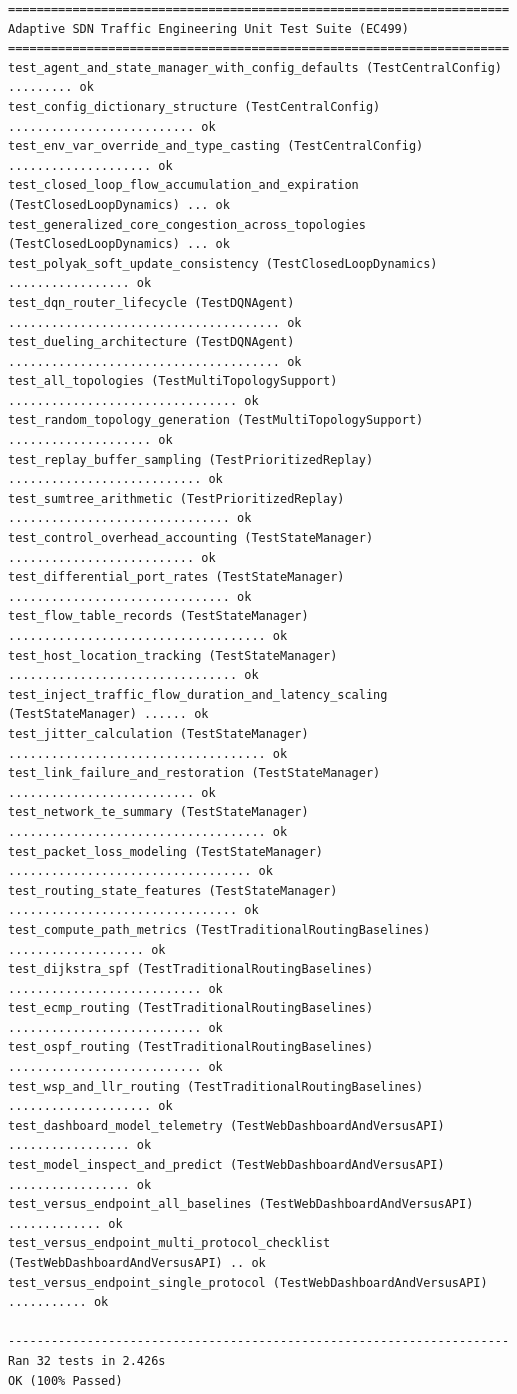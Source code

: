 \begin{lstlisting}[basicstyle=\ttfamily\scriptsize, caption={Full Execution Log of the Automated Test Suite (test\_suite.py)}]
======================================================================
Adaptive SDN Traffic Engineering Unit Test Suite (EC499)
======================================================================
test_agent_and_state_manager_with_config_defaults (TestCentralConfig) ......... ok
test_config_dictionary_structure (TestCentralConfig) .......................... ok
test_env_var_override_and_type_casting (TestCentralConfig) .................... ok
test_closed_loop_flow_accumulation_and_expiration (TestClosedLoopDynamics) ... ok
test_generalized_core_congestion_across_topologies (TestClosedLoopDynamics) ... ok
test_polyak_soft_update_consistency (TestClosedLoopDynamics) ................. ok
test_dqn_router_lifecycle (TestDQNAgent) ...................................... ok
test_dueling_architecture (TestDQNAgent) ...................................... ok
test_all_topologies (TestMultiTopologySupport) ................................ ok
test_random_topology_generation (TestMultiTopologySupport) .................... ok
test_replay_buffer_sampling (TestPrioritizedReplay) ........................... ok
test_sumtree_arithmetic (TestPrioritizedReplay) ............................... ok
test_control_overhead_accounting (TestStateManager) .......................... ok
test_differential_port_rates (TestStateManager) ............................... ok
test_flow_table_records (TestStateManager) .................................... ok
test_host_location_tracking (TestStateManager) ................................ ok
test_inject_traffic_flow_duration_and_latency_scaling (TestStateManager) ...... ok
test_jitter_calculation (TestStateManager) .................................... ok
test_link_failure_and_restoration (TestStateManager) .......................... ok
test_network_te_summary (TestStateManager) .................................... ok
test_packet_loss_modeling (TestStateManager) .................................. ok
test_routing_state_features (TestStateManager) ................................ ok
test_compute_path_metrics (TestTraditionalRoutingBaselines) ................... ok
test_dijkstra_spf (TestTraditionalRoutingBaselines) ........................... ok
test_ecmp_routing (TestTraditionalRoutingBaselines) ........................... ok
test_ospf_routing (TestTraditionalRoutingBaselines) ........................... ok
test_wsp_and_llr_routing (TestTraditionalRoutingBaselines) .................... ok
test_dashboard_model_telemetry (TestWebDashboardAndVersusAPI) ................. ok
test_model_inspect_and_predict (TestWebDashboardAndVersusAPI) ................. ok
test_versus_endpoint_all_baselines (TestWebDashboardAndVersusAPI) ............. ok
test_versus_endpoint_multi_protocol_checklist (TestWebDashboardAndVersusAPI) .. ok
test_versus_endpoint_single_protocol (TestWebDashboardAndVersusAPI) ........... ok

----------------------------------------------------------------------
Ran 32 tests in 2.426s
OK (100% Passed)
\end{lstlisting}

